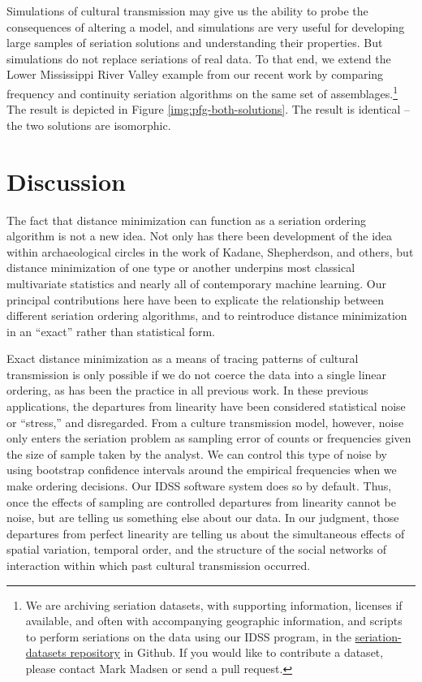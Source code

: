 Simulations of cultural transmission may give us the ability to probe
the consequences of altering a model, and simulations are very useful
for developing large samples of seriation solutions and understanding
their properties. But simulations do not replace seriations of real
data. To that end, we extend the Lower Mississippi River Valley example
from our recent work \citep{lipomadsendunnell2015} by comparing
frequency and continuity seriation algorithms on the same set of
assemblages.\footnote{We are archiving seriation datasets, with
  supporting information, licenses if available, and often with
  accompanying geographic information, and scripts to perform seriations
  on the data using our IDSS program, in the
  \href{https://github.com/mmadsen/seriation-datasets}{seriation-datasets
  repository} in Github. If you would like to contribute a dataset,
  please contact Mark Madsen or send a pull request.} The result is
depicted in Figure \ref{img:pfg-both-solutions}. The result is identical
-- the two solutions are isomorphic.

\section{Discussion}\label{discussion}

The fact that distance minimization can function as a seriation ordering
algorithm is not a new idea. Not only has there been development of the
idea within archaeological circles in the work of Kadane, Shepherdson,
and others, but distance minimization of one type or another underpins
most classical multivariate statistics and nearly all of contemporary
machine learning. Our principal contributions here have been to
explicate the relationship between different seriation ordering
algorithms, and to reintroduce distance minimization in an ``exact''
rather than statistical form.

Exact distance minimization as a means of tracing patterns of cultural
transmission is only possible if we do not coerce the data into a single
linear ordering, as has been the practice in all previous work. In these
previous applications, the departures from linearity have been
considered statistical noise or ``stress,'' and disregarded. From a
culture transmission model, however, noise only enters the seriation
problem as sampling error of counts or frequencies given the size of
sample taken by the analyst. We can control this type of noise by using
bootstrap confidence intervals around the empirical frequencies when we
make ordering decisions. Our IDSS software system does so by default.
Thus, once the effects of sampling are controlled departures from
linearity cannot be noise, but are telling us something else about our
data. In our judgment, those departures from perfect linearity are
telling us about the simultaneous effects of spatial variation, temporal
order, and the structure of the social networks of interaction within
which past cultural transmission occurred.

